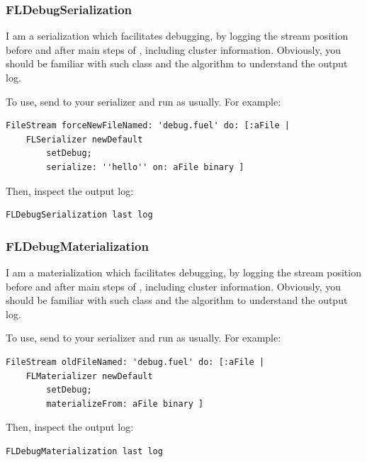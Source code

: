 \documentclass[a4paper,10pt,twoside]{book}
\begin{document}
\subsubsection{FLDebugSerialization}
I am a serialization which facilitates debugging, by logging the stream position before and after main steps of , including cluster information. Obviously, you should be familiar with such class and the algorithm to understand the output log.

To use, send  to your serializer and run as usually. For example:

\begin{lstlisting}
FileStream forceNewFileNamed: 'debug.fuel' do: [:aFile |
    FLSerializer newDefault
        setDebug;
        serialize: ''hello'' on: aFile binary ]
\end{lstlisting}

Then, inspect the output log:

\begin{lstlisting}
FLDebugSerialization last log
\end{lstlisting}

\subsubsection{FLDebugMaterialization}
I am a materialization which facilitates debugging, by logging the stream position before and after main steps of , including cluster information. Obviously, you should be familiar with such class and the algorithm to understand the output log.

To use, send  to your serializer and run as usually. For example:

\begin{lstlisting}
FileStream oldFileNamed: 'debug.fuel' do: [:aFile |
    FLMaterializer newDefault
        setDebug;
        materializeFrom: aFile binary ]
\end{lstlisting}

Then, inspect the output log:

\begin{lstlisting}
FLDebugMaterialization last log
\end{lstlisting}


\end{document}
